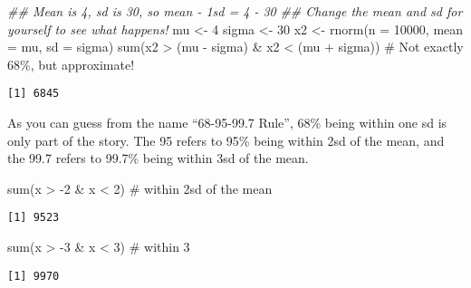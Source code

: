 \documentclass[
  letterpaper,
  DIV=11,
  numbers=noendperiod]{scrreprt}
\newenvironment{Shaded}{\begin{snugshade}}{\end{snugshade}}
\newcommand{\AttributeTok}[1]{\textcolor[rgb]{0.40,0.45,0.13}{#1}}
\newcommand{\CommentTok}[1]{\textcolor[rgb]{0.37,0.37,0.37}{#1}}
\newcommand{\DecValTok}[1]{\textcolor[rgb]{0.68,0.00,0.00}{#1}}
\newcommand{\DocumentationTok}[1]{\textcolor[rgb]{0.37,0.37,0.37}{\textit{#1}}}
\newcommand{\FunctionTok}[1]{\textcolor[rgb]{0.28,0.35,0.67}{#1}}
\newcommand{\NormalTok}[1]{\textcolor[rgb]{0.00,0.23,0.31}{#1}}
\newcommand{\OtherTok}[1]{\textcolor[rgb]{0.00,0.23,0.31}{#1}}
\newcommand{\SpecialCharTok}[1]{\textcolor[rgb]{0.37,0.37,0.37}{#1}}
\begin{document}
\begin{Shaded}
\begin{Highlighting}[]
\DocumentationTok{\#\# Mean is 4, sd is 30, so mean {-} 1sd = 4 {-} 30}
\DocumentationTok{\#\# Change the mean and sd for yourself to see what happens!}
\NormalTok{mu }\OtherTok{\textless{}{-}} \DecValTok{4}
\NormalTok{sigma }\OtherTok{\textless{}{-}} \DecValTok{30}
\NormalTok{x2 }\OtherTok{\textless{}{-}} \FunctionTok{rnorm}\NormalTok{(}\AttributeTok{n =} \DecValTok{10000}\NormalTok{, }\AttributeTok{mean =}\NormalTok{ mu, }\AttributeTok{sd =}\NormalTok{ sigma)}
\FunctionTok{sum}\NormalTok{(x2 }\SpecialCharTok{\textgreater{}}\NormalTok{ (mu }\SpecialCharTok{{-}}\NormalTok{ sigma) }\SpecialCharTok{\&}\NormalTok{ x2 }\SpecialCharTok{\textless{}}\NormalTok{ (mu }\SpecialCharTok{+}\NormalTok{ sigma)) }\CommentTok{\# Not exactly 68\%, but approximate!}
\end{Highlighting}
\end{Shaded}

\begin{verbatim}
[1] 6845
\end{verbatim}

As you can guess from the name ``68-95-99.7 Rule'', 68\% being within
one sd is only part of the story. The 95 refers to 95\% being within 2sd
of the mean, and the 99.7 refers to 99.7\% being within 3sd of the mean.

\begin{Shaded}
\begin{Highlighting}[]
\FunctionTok{sum}\NormalTok{(x }\SpecialCharTok{\textgreater{}} \SpecialCharTok{{-}}\DecValTok{2} \SpecialCharTok{\&}\NormalTok{ x }\SpecialCharTok{\textless{}} \DecValTok{2}\NormalTok{) }\CommentTok{\# within 2sd of the mean}
\end{Highlighting}
\end{Shaded}

\begin{verbatim}
[1] 9523
\end{verbatim}

\begin{Shaded}
\begin{Highlighting}[]
\FunctionTok{sum}\NormalTok{(x }\SpecialCharTok{\textgreater{}} \SpecialCharTok{{-}}\DecValTok{3} \SpecialCharTok{\&}\NormalTok{ x }\SpecialCharTok{\textless{}} \DecValTok{3}\NormalTok{) }\CommentTok{\# within 3}
\end{Highlighting}
\end{Shaded}

\begin{verbatim}
[1] 9970
\end{verbatim}
\end{document}
